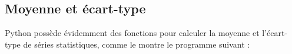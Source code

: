 
\subsection{Moyenne et écart-type}

Python possède évidemment des fonctions pour calculer la moyenne et l'écart-type de séries statistiques, comme le montre le programme suivant :


